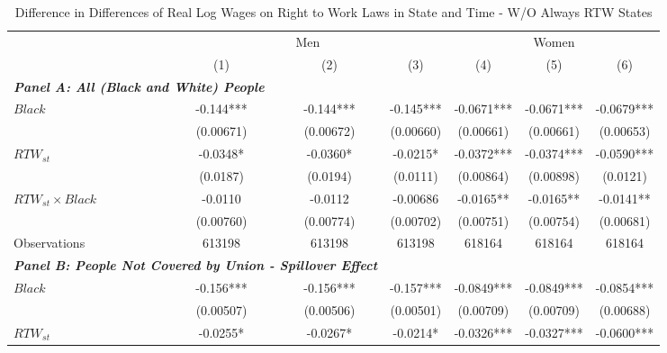 \begin{table}[ht!]\centering
\def\sym#1{\ifmmode^{#1}\else\(^{#1}\)\fi}
\caption{Difference in Differences of Real Log Wages on Right to Work Laws in State and Time - W/O Always RTW States}
\fontsize{10}{11}\selectfont
\begin{tabular}{l*{6}{c}}
\hline
&\multicolumn{3}{c}{Men}                        &\multicolumn{3}{c}{Women}                      \\\cmidrule(lr){2-4}\cmidrule(lr){5-7}
&\multicolumn{1}{c}{(1)}   &\multicolumn{1}{c}{(2)}   &\multicolumn{1}{c}{(3)}   &\multicolumn{1}{c}{(4)}   &\multicolumn{1}{c}{(5)}   &\multicolumn{1}{c}{(6)}   \\
\hline
\multicolumn{3}{l}{\linebreak \textbf{\textit{Panel A: All (Black and White) People}}} \\
$ Black $           &      -0.144***&      -0.144***&      -0.145***&     -0.0671***&     -0.0671***&     -0.0679***\\
&   (0.00671)   &   (0.00672)   &   (0.00660)   &   (0.00661)   &   (0.00661)   &   (0.00653)   \\
[1em]
$ RTW_{st} $      &     -0.0348*  &     -0.0360*  &     -0.0215*  &     -0.0372***&     -0.0374***&     -0.0590***\\
&    (0.0187)   &    (0.0194)   &    (0.0111)   &   (0.00864)   &   (0.00898)   &    (0.0121)   \\
[1em]
$ RTW_{st} \times Black $&     -0.0110   &     -0.0112   &    -0.00686   &     -0.0165** &     -0.0165** &     -0.0141** \\
&   (0.00760)   &   (0.00774)   &   (0.00702)   &   (0.00751)   &   (0.00754)   &   (0.00681)   \\
\hline
Observations        &      613198   &      613198   &      613198   &      618164   &      618164   &      618164   \\
\hline
\multicolumn{3}{l}{\linebreak \textbf{\textit{Panel B: People Not Covered by Union - Spillover Effect}}} \\
$ Black $           &      -0.156***&      -0.156***&      -0.157***&     -0.0849***&     -0.0849***&     -0.0854***\\
&   (0.00507)   &   (0.00506)   &   (0.00501)   &   (0.00709)   &   (0.00709)   &   (0.00688)   \\
[1em]
$ RTW_{st} $      &     -0.0255*  &     -0.0267*  &     -0.0214*  &     -0.0326***&     -0.0327***&     -0.0600***\\

\end{tabular}
\end{table}
